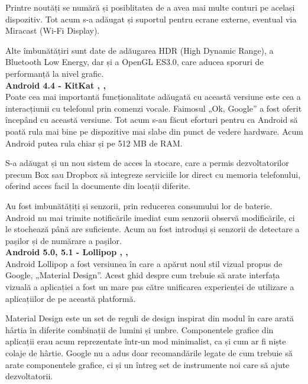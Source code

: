 \documentclass[12pt, a4paper, oneside]{article}
\begin{document}
	Printre noutăți se numără și posiblitatea de a avea mai multe conturi pe același dispozitiv. Tot acum s-a adăugat și suportul pentru ecrane externe, eventual via Miracast (Wi-Fi Display).

	Alte îmbunătățiri sunt date de adăugarea HDR (High Dynamic Range), a Bluetooth Low Energy, dar și a OpenGL ES3.0, care aducea sporuri de performanță la nivel grafic.\\

\textbf{Android 4.4 - KitKat \cite{AndroidVersionsHistory}, \cite{AndroidHistory}, \cite{DeveloperAndroid}}\\
Poate cea mai importantă funcționalitate adăugată cu această versiune este cea a interacțiunii cu telefonul prin comenzi vocale. Faimosul „Ok, Google” a fost oferit începând cu această versiune. Tot acum s-au făcut eforturi pentru ca Android să poată rula mai bine pe dispozitive mai slabe din punct de vedere hardware. Acum Android putea rula chiar și pe 512 MB de RAM.

	S-a adăugat și un nou sistem de acces la stocare, care a permis dezvoltatorilor precum Box sau Dropbox să integreze serviciile lor direct cu memoria telefonului, oferind acces facil la documente din locații diferite.

	Au fost imbunătățiți și senzorii, prin reducerea consumului lor de baterie. Android nu  mai trimite notificările imediat cum senzorii observă modificările, ci le stochează până are suficiente.  Acum au fost introduși și senzorii de detectare a pașilor și de numărare a pașilor.\\
	
\textbf{Android 5.0, 5.1 - Lollipop \cite{AndroidVersionsHistory}, \cite{AndroidHistory}, \cite{DeveloperAndroid}}\\
Android Lollipop a fost versiunea în care a apărut noul stil vizual propus de Google, „Material Design”. Acest ghid despre cum trebuie să arate interfața vizuală a aplicației a fost un mare pas către unificarea experienței de utilizare a aplicațiilor de pe această platformă.
	
	Material Design este un set de reguli de design inspirat din modul în care arată hârtia în diferite combinații de lumini și umbre.
Componentele grafice din aplicații erau acum reprezentate într-un mod minimalist, ca și cum ar fi niște colaje de hârtie. Google nu a adus doar recomandările legate de cum trebuie să arate componentele grafice, ci și un întreg set de instrumente noi care să ajute dezvoltatorii.
	
\end{document}
